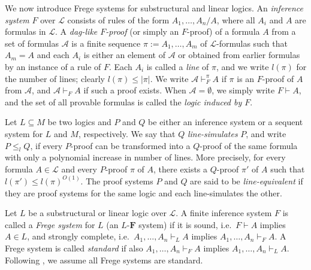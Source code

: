 \documentclass[12pt,a4paper]{article}
\theoremstyle{plain}
\theoremstyle{definition}
\newcommand{\F}{\mathbf{F}}
\begin{document}
We now introduce Frege systems for substructural and linear logics. An \emph{inference system} $F$ over $\mathcal{L}$ consists of rules of the form $A_1,\ldots,A_n / A$, where all $A_i$ and $A$ are formulas in $\mathcal{L}$.
A \emph{dag-like $F$-proof} (or simply an $F$-proof) of a formula $A$ from a set of formulas $\mathcal{A}$ is a finite sequence $\pi := A_1,\ldots,A_m$ of $\mathcal{L}$-formulas such that $A_m=A$ and each $A_i$ is either an element of $\mathcal{A}$ or obtained from earlier formulas by an instance of a rule of $F$. 
Each $A_i$ is called a \emph{line} of $\pi$, and we write $l(\pi)$ for the number of lines; clearly $l(\pi)\le |\pi|$.
We write $\mathcal{A} \vdash_F^{\pi} A$ if $\pi$ is an $F$-proof of $A$ from $\mathcal{A}$, and $\mathcal{A} \vdash_F A$ if such a proof exists. When $\mathcal{A}=\emptyset$, we simply write $F \vdash A$, and the set of all provable formulas is called the \emph{logic induced by $F$}.

Let $L \subseteq M$ be two logics and $P$ and $Q$ be either an inference system or a sequent system for $L$ and $M$, respectively. We say that $Q$ \emph{line-simulates} $P$, and write $P \leq_l Q$, if every $P$-proof can be transformed into a $Q$-proof of the same formula with only a polynomial increase in number of lines. More precisely, for every formula $A \in \mathcal{L}$ and every $P$-proof $\pi$ of $A$, there exists a $Q$-proof $\pi'$ of $A$ such that $l(\pi') \leq l(\pi)^{O(1)}$.
The proof systems $P$ and $Q$ are said to be \emph{line-equivalent} if they are proof systems for the same logic and each line-simulates the other.  

Let $L$ be a substructural or linear logic over $\mathcal{L}$. A finite inference system $F$ is called a \emph{Frege system} for $L$ (an $L$-$\F$ system) if it is sound, i.e.\ $F \vdash A$ implies $A \in L$, and strongly complete, i.e.\ $A_1,\ldots,A_n \vdash_L A$ implies $A_1,\ldots,A_n \vdash_F A$. A Frege system is called \emph{standard} if also $A_1,\ldots,A_n \vdash_F A$ implies $A_1,\ldots,A_n \vdash_L A$. Following \cite{jerabek}, we assume all Frege systems are standard.
\end{document}
